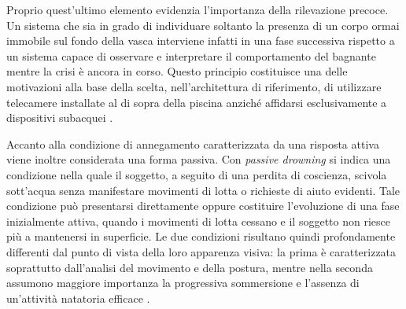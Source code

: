 Proprio quest'ultimo elemento evidenzia l'importanza della rilevazione precoce. Un sistema che sia in grado di individuare soltanto la presenza di un corpo ormai immobile sul fondo della vasca interviene infatti in una fase successiva rispetto a un sistema capace di osservare e interpretare il comportamento del bagnante mentre la crisi è ancora in corso. Questo principio costituisce una delle motivazioni alla base della scelta, nell'architettura di riferimento, di utilizzare telecamere installate al di sopra della piscina anziché affidarsi esclusivamente a dispositivi subacquei \cite{Eng2003Automatic,Eng2006Robust,Eng2008DEWS}.

Accanto alla condizione di annegamento caratterizzata da una risposta attiva viene inoltre considerata una forma passiva. Con \emph{passive drowning} si indica una condizione nella quale il soggetto, a seguito di una perdita di coscienza, scivola sott'acqua senza manifestare movimenti di lotta o richieste di aiuto evidenti. Tale condizione può presentarsi direttamente oppure costituire l'evoluzione di una fase inizialmente attiva, quando i movimenti di lotta cessano e il soggetto non riesce più a mantenersi in superficie. Le due condizioni risultano quindi profondamente differenti dal punto di vista della loro apparenza visiva: la prima è caratterizzata soprattutto dall'analisi del movimento e della postura, mentre nella seconda assumono maggiore importanza la progressiva sommersione e l'assenza di un'attività natatoria efficace \cite{Kam2002Drowning,Lu2004Vision}.

